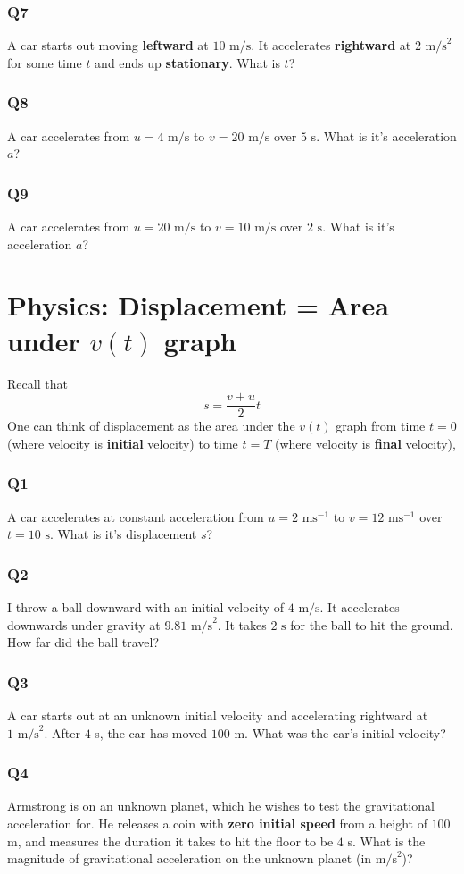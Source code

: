 \documentclass{article}
\begin{document}
\subsubsection{Q7}
A car starts out moving \textbf{leftward} at $10 \text{ m/s}$. It accelerates \textbf{rightward} at $2\text{ m/s}^2$ for some time $t$ and ends up \textbf{stationary}. What is $t$?
\subsubsection{Q8}
A car accelerates from $u=4\text{ m/s}$ to $v=20\text{ m/s}$ over $5\text{ s}$. What is it's acceleration $a$?
\subsubsection{Q9}
A car accelerates from $u=20\text{ m/s}$ to $v=10\text{ m/s}$ over $2\text{ s}$. What is it's acceleration $a$?
\section{Physics: Displacement = Area under $v(t)$ graph}
Recall that $$s=\frac{v+u}{2} t$$
One can think of displacement as the area under the $v(t)$ graph from time $t=0$ (where velocity is \textbf{initial} velocity) to time $t=T$ (where velocity is \textbf{final} velocity), 
\subsubsection{Q1}
A car accelerates at constant acceleration from $u=2\text{ ms}^{-1}$ to $v=12\text{ ms}^{-1}$ over $t=10\text{ s}$. What is it's displacement $s$?
\subsubsection{Q2}
I throw a ball downward with an initial velocity of $4 \text{ m/s}$. It accelerates downwards under gravity at $9.81 \text{ m/s}^2$. It takes $2 \text{ s}$ for the ball to hit the ground. How far did the ball travel? 
\subsubsection{Q3}
A car starts out at an unknown initial velocity and accelerating rightward at $1 \text{ m/s}^2$. After $4$ s, the car has moved $100$ m. What was the car's initial velocity? 
\subsubsection{Q4}
Armstrong is on an unknown planet, which he wishes to test the gravitational acceleration for. He releases a coin with \textbf{zero initial speed} from a height of $100$ m, and measures the duration it takes to hit the floor to be $4$ s. What is the magnitude of gravitational acceleration on the unknown planet (in $\text{m/s}^2$)?
\end{document}
